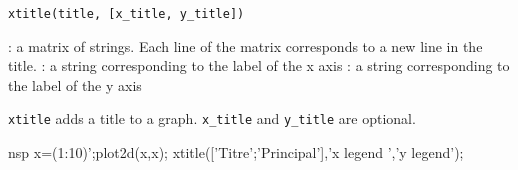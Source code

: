 
\begin{mandesc}
\end{mandesc}

\begin{calling_sequence}
\begin{verbatim}
xtitle(title, [x_title, y_title])
\end{verbatim}
\end{calling_sequence}
\begin{parameters}
  \begin{varlist}
    : a matrix of strings. Each line of the matrix corresponds to a new line
    in the title.
    : a string corresponding to the label of the x axis
    : a string corresponding to the label of the y axis
\end{varlist}
\end{parameters}

\begin{mandescription}
  \verb+xtitle+ adds a title to a graph. \verb+x_title+ and \verb+y_title+ are optional.
\end{mandescription}

\begin{examples}
\begin{mintednsp}{nsp}
x=(1:10)';plot2d(x,x);
xtitle(['Titre';'Principal'],'x legend ','y legend');
\end{mintednsp}
\end{examples}

\begin{manseealso}
\end{manseealso}


